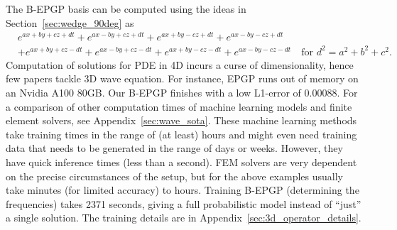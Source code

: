 \documentclass{article} %
\theoremstyle{plain}
\theoremstyle{definition}
\theoremstyle{remark}
\begin{document}
The B-EPGP basis can be computed using the ideas in Section~\ref{sec:wedge_90deg} as 
\begin{align*}
    &e^{a x+b y+c z+d t}+e^{a x-b y+c z+d t}+e^{a x+b y-c z+d t}
    +e^{a x-b y-c z+d t}\\
    &+e^{a x+b y+c z-d t}+e^{a x-b y+c z-d t}+e^{a x+b y-c z-d t}+e^{a x-b y-c z-d t}\quad\text{for $d^2=a^2+b^2+c^2$}.
\end{align*}
Computation of solutions for PDE in 4D incurs a curse of dimensionality, hence few papers tackle 3D wave equation. For instance,  EPGP runs out of memory on an Nvidia A100 80GB. Our B-EPGP finishes with a low L1-error of 0.00088. For a comparison of other computation times of machine learning models and finite element solvers, see Appendix~\ref{sec:wave_sota}.
These machine learning methods take training times in the range of (at least) hours and might even need training data that needs to be generated in the range of days or weeks. However, they have quick inference times (less than a second).
FEM solvers are very dependent on the precise circumstances of the setup, but for the above examples usually take  minutes (for limited accuracy) to hours.
Training B-EPGP (determining the frequencies)  takes 2371 seconds, giving a full probabilistic model instead of ``just'' a single solution. The training details are in Appendix~\ref{sec:3d_operator_details}.
\end{document}
